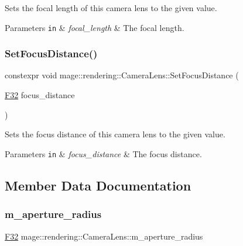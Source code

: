 Sets the focal length of this camera lens to the given value.


\begin{DoxyParams}[1]{Parameters}
\mbox{\tt in}  & {\em focal\+\_\+length} & The focal length. \\
\hline
\end{DoxyParams}
\mbox{\label{classmage_1_1rendering_1_1_camera_lens_ae2ea1ae80e1eb3734d81dcf6d0a127d3}} 
\subsubsection{\texorpdfstring{Set\+Focus\+Distance()}{SetFocusDistance()}}
{\footnotesize\ttfamily constexpr void mage\+::rendering\+::\+Camera\+Lens\+::\+Set\+Focus\+Distance (\begin{DoxyParamCaption}\item[{\mbox{\hyperlink{namespacemage_aa97e833b45f06d60a0a9c4fc22ae02c0}{F32}}}]{focus\+\_\+distance }\end{DoxyParamCaption})\hspace{0.3cm}{\ttfamily [noexcept]}}

Sets the focus distance of this camera lens to the given value.


\begin{DoxyParams}[1]{Parameters}
\mbox{\tt in}  & {\em focus\+\_\+distance} & The focus distance. \\
\hline
\end{DoxyParams}


\subsection{Member Data Documentation}
\mbox{\label{classmage_1_1rendering_1_1_camera_lens_a50f361ad01d0b35fdc46086de720ebd8}} 
\subsubsection{\texorpdfstring{m\+\_\+aperture\+\_\+radius}{m\_aperture\_radius}}
{\footnotesize\ttfamily \mbox{\hyperlink{namespacemage_aa97e833b45f06d60a0a9c4fc22ae02c0}{F32}} mage\+::rendering\+::\+Camera\+Lens\+::m\+\_\+aperture\+\_\+radius\hspace{0.3cm}{\ttfamily [private]}}

